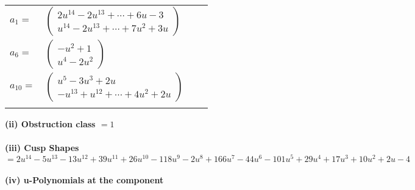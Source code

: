 \documentclass[1p]{elsarticle_modified}
\theoremstyle{definition}
\begin{document}
\begin{tabular}{m{7pt} m{180pt} m{7pt} m{180pt} }
\flushright $a_{1}=$&$\begin{pmatrix}2 u^{14}-2 u^{13}+\cdots+6 u-3\\u^{14}-2 u^{13}+\cdots+7 u^2+3 u\end{pmatrix}$ \\
\flushright $a_{6}=$&$\begin{pmatrix}- u^2+1\\u^4-2 u^2\end{pmatrix}$ \\
\flushright $a_{10}=$&$\begin{pmatrix}u^5-3 u^3+2 u\\- u^{13}+u^{12}+\cdots+4 u^2+2 u\end{pmatrix}$\\&\end{tabular}
\flushleft \textbf{(ii) Obstruction class $= 1$}\\~\\
\flushleft \textbf{(iii) Cusp Shapes $= 2 u^{14}-5 u^{13}-13 u^{12}+39 u^{11}+26 u^{10}-118 u^9-2 u^8+166 u^7-44 u^6-101 u^5+29 u^4+17 u^3+10 u^2+2 u-4$}\\~\\
\newpage\renewcommand{\arraystretch}{1}
\flushleft \textbf{(iv) u-Polynomials at the component}\newline \\
\end{document}
